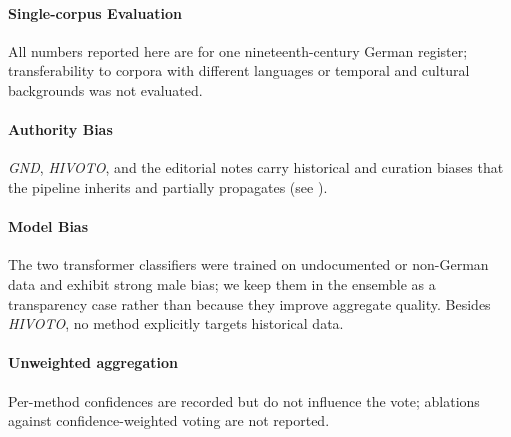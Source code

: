 \documentclass{eceasst}
\begin{document}
\paragraph{Single-corpus Evaluation} All numbers reported here are for one nineteenth-century German register; transferability to corpora with different languages or temporal and cultural backgrounds was not evaluated. \paragraph{Authority Bias} \textit{GND}, \textit{HIVOTO}, and the editorial notes carry historical and curation biases that the pipeline inherits and partially propagates (see ). \paragraph{Model Bias} The two transformer classifiers were trained on undocumented or non-German data and exhibit strong male bias; we keep them in the ensemble as a transparency case rather than because they improve aggregate quality. Besides \textit{HIVOTO}, no method explicitly targets historical data. \paragraph{Unweighted aggregation} Per-method confidences are recorded but do not influence the vote; ablations against confidence-weighted voting are not reported.
\end{document}
